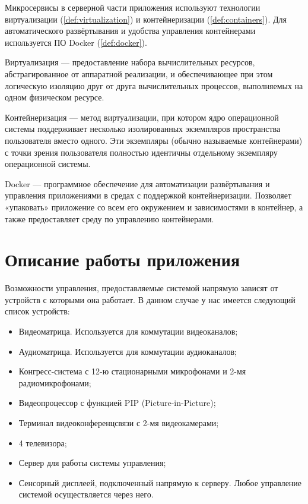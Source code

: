 \noindent Микросервисы в серверной части приложения используют технологии виртуализации (\ref{def:virtualization}) и
контейнеризации (\ref{def:containers}). Для автоматического развёртывания и удобства управления контейнерами используется
ПО Docker (\ref{def:docker}).

\begin{definition}
    \label{def:virtualization}
    Виртуализация — предоставление набора вычислительных ресурсов, абстрагированное от аппаратной реализации,
    и обеспечивающее при этом логическую изоляцию друг от друга вычислительных процессов, выполняемых на одном
    физическом ресурсе. 
\end{definition}

\begin{definition}
    \label{def:containers}
    Контейнеризация — метод виртуализации, при котором ядро операционной системы поддерживает несколько изолированных
    экземпляров пространства пользователя вместо одного. Эти экземпляры (обычно называемые контейнерами) с точки зрения
    пользователя полностью идентичны отдельному экземпляру операционной системы.
\end{definition}

\begin{definition}
    \label{def:docker}
    Docker — программное обеспечение для автоматизации развёртывания и управления приложениями в средах с
    поддержкой контейнеризации. Позволяет «упаковать» приложение со всем его окружением и зависимостями в контейнер,
    а также предоставляет среду по управлению контейнерами.
\end{definition}

\clearpage

\section{Описание работы приложения}

Возможности управления, предоставляемые системой напрямую зависят от устройств с которыми она работает. В данном случае
у нас имеется следующий список устройств:

\begin{itemize}
    \item Видеоматрица. Используется для коммутации видеоканалов;
    \item Аудиоматрица. Используется для коммутации аудиоканалов;
    \item Конгресс-система с 12-ю стационарными микрофонами и 2-мя радиомикрофонами;
    \item Видеопроцессор с функцией PIP (Picture-in-Picture);
    \item Терминал видеоконференцсвязи с 2-мя видеокамерами;
    \item 4 телевизора;
    \item Сервер для работы системы управления;
    \item Сенсорный дисплеей, подключенный напрямую к серверу. Любое управление системой осуществляется через него.
\end{itemize}

